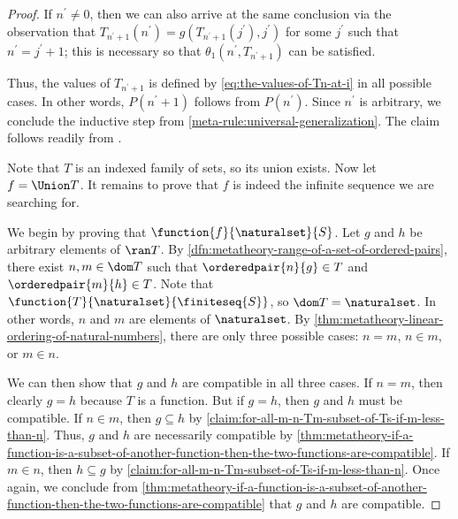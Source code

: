 \begin{proof}
    \vspace{0.3cm}
    \noindent
    If \( n^{\prime} \neq 0 \), then we can also arrive at the same conclusion via the observation that
    \( T_{n^{\prime} + 1}(n^{\prime}) = g(T_{n^{\prime} + 1}(j^{\prime}), j^{\prime}) \) for some \( j^{\prime} \) such that \( n^{\prime} = j^{\prime} + 1 \);
    this is necessary so that \( \theta_{1}(n^{\prime}, T_{n^{\prime} + 1}) \) can be satisfied.

    \vspace{0.3cm}
    \noindent
    Thus, the values of \( T_{n^{\prime} + 1} \) is defined by \eqref{eq:the-values-of-Tn-at-i} in all possible cases.
    In other words, \( P(n^{\prime} + 1) \) follows from \( P(n^{\prime}) \).
    Since \( n^{\prime} \) is arbitrary, we conclude the inductive step from \cref{meta-rule:universal-generalization}.
    The claim follows readily from .

    \vspace{0.3cm}
    \noindent
    Note that \( T \) is an indexed family of sets, so its union exists.
    Now let \( f = \Union T \).
    It remains to prove that \( f \) is indeed the infinite sequence we are searching for.

    \vspace{0.3cm}
    \noindent
    We begin by proving that \( \function{f}{\naturalset}{S} \).
    Let \( g \) and \( h \) be arbitrary elements of \( \ran T \).
    By \cref{dfn:metatheory-range-of-a-set-of-ordered-pairs}, there exist \( n, m \in \dom T \) such that \( \orderedpair{n}{g} \in T \) and \( \orderedpair{m}{h} \in T \).
    Note that \( \function{T}{\naturalset}{\finiteseq{S}} \), so \( \dom T = \naturalset \).
    In other words, \( n \) and \( m \) are elements of \( \naturalset \).
    By \cref{thm:metatheory-linear-ordering-of-natural-numbers}, there are only three possible cases: \( n = m \), \( n \in m \), or \( m \in n \).

    \vspace{0.3cm}
    \noindent
    We can then show that \( g \) and \( h \) are compatible in all three cases.
    If \( n = m \), then clearly \( g = h \) because \( T \) is a function. But if \( g = h \), then \( g \) and \( h \) must be compatible.
    If \( n \in m \), then \( g \subseteq h \) by \cref{claim:for-all-m-n-Tm-subset-of-Ts-if-m-less-than-n}.
    Thus, \( g \) and \( h \) are necessarily compatible by \cref{thm:metatheory-if-a-function-is-a-subset-of-another-function-then-the-two-functions-are-compatible}.
    If \( m \in n \), then \( h \subseteq g \) by \cref{claim:for-all-m-n-Tm-subset-of-Ts-if-m-less-than-n}.
    Once again, we conclude from \cref{thm:metatheory-if-a-function-is-a-subset-of-another-function-then-the-two-functions-are-compatible} that \( g \) and \( h \)
    are compatible.


\end{proof}
